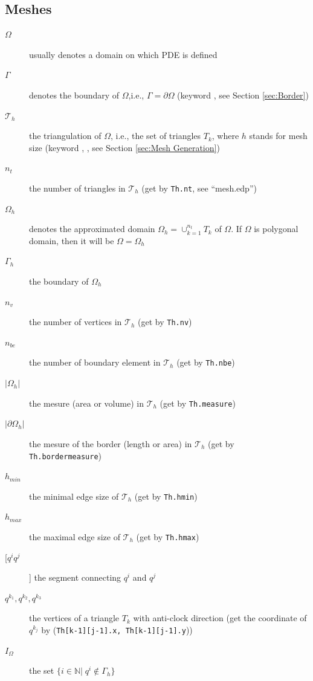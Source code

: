 \documentclass[a4paper,twoside,12pt]{book}
\def\N{\mathbb{N}}
\def\p{\partial}
\def\refSec#1{Section \ref{sec:#1}}
\begin{document}
\subsection{Meshes}
\begin{description}
  \item[$\Omega$] usually denotes a domain on which PDE is defined
  \item[$\Gamma$] denotes the boundary of $\Omega$,i.e., $\Gamma=\p\Omega
$ (keyword , see \refSec{Border})
  \item[$\mathcal{T}_h$] the triangulation of $\Omega$, i.e., the set of triangles $T_k$, where $h$ stands for mesh size (keyword , , see \refSec{Mesh Generation})
  \item[$n_t$] the number of triangles in $\mathcal{T}_h$ (get by \texttt{Th.nt}, see ``mesh.edp'')  
  \item[$\Omega_h$] denotes the approximated domain $\Omega_h=\cup_{k=1}^{n_t}T_k$ of $\Omega$. If $\Omega$ is polygonal domain, then it will be $\Omega=\Omega_h$
  \item[$\Gamma_h$] the boundary of $\Omega_h$
  \item[$n_v$] the number of vertices in $\mathcal{T}_h$ (get by \texttt{Th.nv})  
  \item[$n_{be}$] the number of boundary element  in $\mathcal{T}_h$ (get by \texttt{Th.nbe})  
  \item[$|\Omega_h|$] the mesure (area or volume)  in $\mathcal{T}_h$ (get by \texttt{Th.measure})  
  \item[$|\partial \Omega_h|$] the mesure of the border (length  or area)  in $\mathcal{T}_h$ (get by \texttt{Th.bordermeasure})  
  \item[$h_{min}$] the minimal edge size of $\mathcal{T}_h$ (get by \texttt{Th.hmin}) 
  \item[$h_{max}$] the maximal edge size of $\mathcal{T}_h$ (get by \texttt{Th.hmax})  
  \item[[$q^iq^j$]] the segment connecting $q^i$ and $q^j$
  \item[$q^{k_1},q^{k_2},q^{k_3}$] the vertices of a triangle $T_k$ with anti-clock direction (get the coordinate of $q^{k_j}$ by
  (\texttt{Th[k-1][j-1].x, Th[k-1][j-1].y}))
  \item[$I_{\Omega}$] the set $\{i\in \N|\; q^i\not\in \Gamma_h\}$
  
\end{description}
\end{document}
